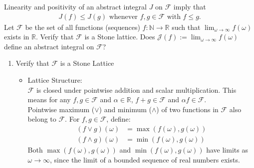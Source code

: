 \documentclass{report}
\begin{document}
{Linearity and positivity of an abstract integral $J$ on $\mathcal{F}$ imply that 
\begin{align*}
    J(f)\leq J(g)\text{ whenever }f,g\in\mathcal{F}\text{ with }f\leq g.
\end{align*}
\ex{}
{    Let $\mathcal{F}$ be the set of all functions (sequences) $f : \mathbb{N} \to \mathbb{R}$ such that $\lim_{\omega \to \infty} f(\omega)$ exists in $\mathbb{R}$. Verify that $\mathcal{F}$ is a Stone lattice. Does $\mathcal{J}(f) := \lim_{\omega \to \infty} f(\omega)$ define an abstract integral on $\mathcal{F}$?}
\begin{myproof}
\begin{enumerate}
    \item Verify that \(\mathcal{F}\) is a Stone Lattice
\begin{itemize}
    \item Lattice Structure:\\
\(\mathcal{F}\) is closed under pointwise addition and scalar multiplication. This means for any \(f, g \in \mathcal{F}\) and \(\alpha \in \mathbb{R}\), \(f + g \in \mathcal{F}\) and \(\alpha f \in \mathcal{F}\).\\
 Pointwise maximum (\(\vee\)) and minimum (\(\wedge\)) of two functions in \(\mathcal{F}\) also belong to \(\mathcal{F}\). For \(f, g \in \mathcal{F}\), define:
     \begin{align*}
       (f \vee g)(\omega) &= \max(f(\omega), g(\omega))\\
     (f \wedge g)(\omega) &= \min(f(\omega), g(\omega))  
     \end{align*}
Both \(\max(f(\omega), g(\omega))\) and \(\min(f(\omega), g(\omega))\) have limits as \(\omega \to \infty\), since the limit of a bounded sequence of real numbers exists.


\end{itemize}
\end{enumerate}
\end{myproof}}
\end{document}
